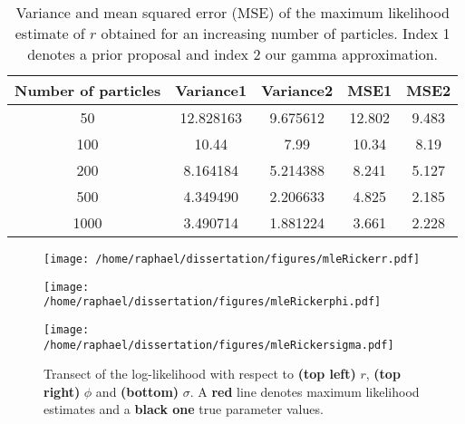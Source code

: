 \documentclass[12pt]{article}
\newcommand{\ra}[1]{\renewcommand{\arraystretch}{#1}}
\begin{document}
	\begin{table}[htb]
		\centering
		\vspace{5mm}
		\ra{1.3}
		\begin{tabular}{@{}ccccc@{}} \toprule
			Number of particles & Variance1 &  Variance2 & MSE1 & MSE2 \\ \midrule
			50 & 12.828163 &  9.675612 & 12.802 & 9.483\\ 
			100 & 10.44 & 7.99 & 10.34 & 8.19\\ 
			200 & 8.164184 & 5.214388 &  8.241 & 5.127\\ 
			500 & 4.349490 & 2.206633 & 4.825 & 2.185\\ 
			1000 & 3.490714 & 1.881224 & 3.661  & 2.228\\  \bottomrule
		\end{tabular}
		\caption[Variance and mean squared error of the MLE of $r$]{Variance and mean squared error (MSE) of the maximum likelihood estimate of $r$ obtained for an increasing number of particles. Index 1 denotes a prior proposal and index 2 our gamma approximation.}
		\label{table:mleR}
	\end{table}
	
	\begin{figure}[htb]
		\centering
		\begin{minipage}{0.6\textwidth}
			\centering
			\texttt{[image: /home/raphael/dissertation/figures/mleRickerr.pdf]}
		\end{minipage}
		\begin{minipage}{0.6\textwidth}
			\centering
			\texttt{[image: /home/raphael/dissertation/figures/mleRickerphi.pdf]}
		\end{minipage}
		\begin{minipage}{0.6\textwidth}
			\centering
			\texttt{[image: /home/raphael/dissertation/figures/mleRickersigma.pdf]}
		\end{minipage}
		\caption[Transect of the log-likelihood of the Ricker model.]{Transect of the log-likelihood with respect to \textbf{(top left)} $r$, \textbf{(top right)} $\phi$ and \textbf{(bottom)} $\sigma$. A \textbf{red} line denotes maximum likelihood estimates and a \textbf{black one} true parameter values.}
		\label{fig:transect}
	\end{figure}
	
\end{document}
